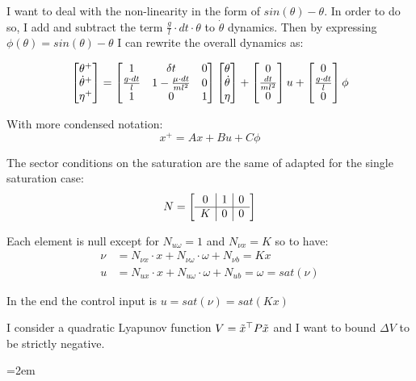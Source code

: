 \documentclass{article}
\begin{document}
I want to deal with the non-linearity in the form of $sin(\theta) - \theta$. In order to do so, I add and subtract the term $\frac{g}{l} \cdot dt \cdot \theta$ to $\dot{\theta}$ dynamics. Then by expressing $\phi(\theta) = sin(\theta) - \theta$ I can rewrite the overall dynamics as:

\begin{equation}
  \left[\begin{matrix}
    \theta^{+} \\
    \dot{\theta}^{+} \\
    \eta^{+}
  \end{matrix}\right] = \left[\begin{matrix}
    1 & \delta t & 0 \\
    \frac{g \cdot dt}{l} & 1 - \frac{\mu \cdot dt}{m l^{2}} & 0 \\
    1 & 0 & 1
  \end{matrix}\right] \left[\begin{matrix}
    \theta \\
    \dot{\theta} \\
    \eta
  \end{matrix}\right] + \left[\begin{matrix}
    0 \\
    \frac{dt}{m l^{2}} \\
    0
  \end{matrix}\right] u + \left[\begin{matrix}
    0 \\
    \frac{g \cdot dt}{l} \\
    0 
  \end{matrix}\right] \phi 
\end{equation}

With more condensed notation:
$$
  x^{+} = A x + B u + C \phi
$$

The sector conditions on the saturation are the same of \cite{css-extended} adapted for the single saturation case:
$$
N = \left[\begin{matrix}
\begin{array}{c|c|c}
  0 & 1 & 0 \\
  \hline
  K & 0 & 0
\end{array}
\end{matrix}\right]
$$

Each element is null except for $N_{u \omega} = 1$ and $N_{\nu x} = K$ so to have:
\begin{align*}
  \nu &= N_{\nu x} \cdot x + N_{\nu \omega} \cdot \omega + N_{\nu b} = K x\\
  u &= N_{ux} \cdot x + N_{u \omega} \cdot \omega + N_{u b} = \omega = sat(\nu)
\end{align*}

In the end the control input is $u = sat(\nu) = sat(K x)$

I consider a quadratic Lyapunov function $V = \tilde{x}^\top P \tilde{x}$ and I want to bound $\Delta V$ to be strictly negative.

\pagebreak
\emergencystretch=2em %
\printbibliography
\end{document}
